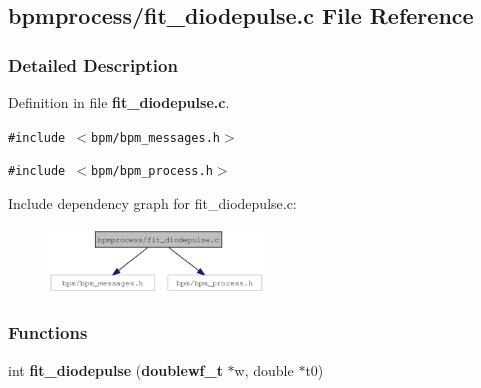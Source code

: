\subsection{bpmprocess/fit\_\-diodepulse.c File Reference}
\label{fit__diodepulse_8c}


\subsubsection{Detailed Description}


Definition in file {\bf fit\_\-diodepulse.c}.

{\tt \#include $<$bpm/bpm\_\-messages.h$>$}\par
{\tt \#include $<$bpm/bpm\_\-process.h$>$}\par


Include dependency graph for fit\_\-diodepulse.c:\nopagebreak
\begin{figure}[H]
\begin{center}
\leavevmode
\includegraphics[width=162pt]{fit__diodepulse_8c__incl}
\end{center}
\end{figure}
\subsubsection*{Functions}
\begin{CompactItemize}
\item 
int {\bf fit\_\-diodepulse} ({\bf doublewf\_\-t} $\ast$w, double $\ast$t0)
\end{CompactItemize}
